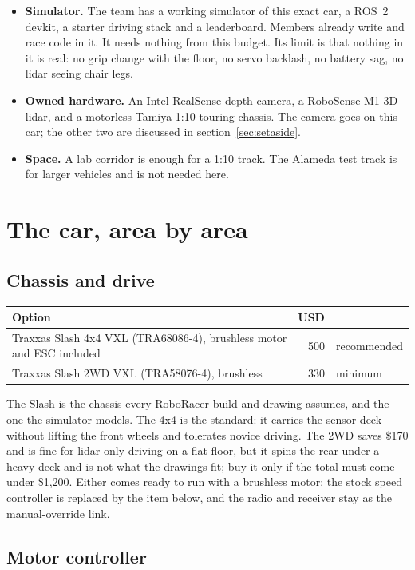 \documentclass[11pt,a4paper]{article}
\begin{document}
\begin{itemize}
  \item \textbf{Simulator.} The team has a working simulator of this exact car, a ROS~2
  devkit, a starter driving stack and a leaderboard. Members already write and race code in
  it. It needs nothing from this budget. Its limit is that nothing in it is real: no grip
  change with the floor, no servo backlash, no battery sag, no lidar seeing chair legs.
  \item \textbf{Owned hardware.} An Intel RealSense depth camera, a RoboSense M1 3D lidar,
  and a motorless Tamiya 1:10 touring chassis. The camera goes on this car; the other two are
  discussed in section~\ref{sec:setaside}.
  \item \textbf{Space.} A lab corridor is enough for a 1:10 track. The Alameda test track is
  for larger vehicles and is not needed here.
\end{itemize}

\section{The car, area by area}

\subsection{Chassis and drive}

\begin{tabularx}{\linewidth}{Xrl}
\toprule
Option & USD & \\
\midrule
Traxxas Slash 4x4 VXL (TRA68086-4), brushless motor and ESC included & 500 & recommended \\
Traxxas Slash 2WD VXL (TRA58076-4), brushless & 330 & minimum \\
\bottomrule
\end{tabularx}

\smallskip
The Slash is the chassis every RoboRacer build and drawing assumes, and the one the
simulator models. The 4x4 is the standard: it carries the sensor deck without lifting the
front wheels and tolerates novice driving. The 2WD saves \$170 and is fine for lidar-only
driving on a flat floor, but it spins the rear under a heavy deck and is not what the drawings
fit; buy it only if the total must come under \$1{,}200. Either comes ready to run with a
brushless motor; the stock speed controller is replaced by the item below, and the radio and
receiver stay as the manual-override link.

\subsection{Motor controller}
\end{document}
